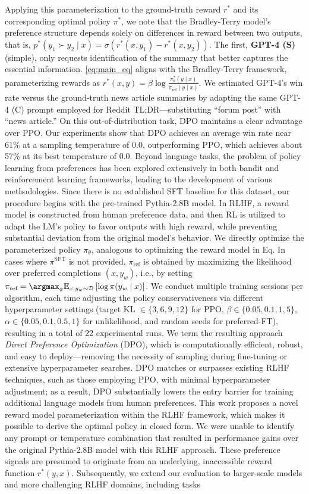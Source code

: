 Applying this parameterization to the ground-truth reward $r^*$ and its corresponding optimal policy $\pi^*$, we note that the Bradley-Terry model’s preference structure depends solely on differences in reward between two outputs, that is, ${p^*(y_1 \succ y_2 \mid x) = \sigma(r^*(x, y_1) - r^*(x, y_2))}$. The first, \textbf{GPT-4 (S)} (simple), only requests identification of the summary that better captures the essential information. \ref{eq:main_eq} aligns with the Bradley-Terry framework, parameterizing rewards as $r^*(x, y) = \beta \log\frac{\pi^*_\theta(y \mid x)}{\pi_\text{ref}(y \mid x)}$. We estimated GPT-4’s win rate versus the ground-truth news article summaries by adapting the same GPT-4 (C) prompt employed for Reddit TL;DR—substituting “forum post” with “news article.” On this out-of-distribution task, DPO maintains a clear advantage over PPO. Our experiments show that DPO achieves an average win rate near 61\% at a sampling temperature of 0.0, outperforming PPO, which achieves about 57\% at its best temperature of 0.0. Beyond language tasks, the problem of policy learning from preferences has been explored extensively in both bandit and reinforcement learning frameworks, leading to the development of various methodologies. Since there is no established SFT baseline for this dataset, our procedure begins with the pre-trained Pythia-2.8B model. In RLHF, a reward model is constructed from human preference data, and then RL is utilized to adapt the LM’s policy to favor outputs with high reward, while preventing substantial deviation from the original model’s behavior. We directly optimize the parameterized policy $\pi_{\theta}$, analogous to optimizing the reward model in Eq. In cases where $\pi^\text{SFT}$ is not provided, $\pi_\text{ref}$ is obtained by maximizing the likelihood over preferred completions ${(x, y_w)}$, i.e., by setting ${\pi_\text{ref} = \argmax_{\pi}\mathbb{E}_{x, y_w \sim \mathcal{D}}\left[\log \pi(y_w \mid x)\right]}$. We conduct multiple training sessions per algorithm, each time adjusting the policy conservativeness via different hyperparameter settings (target KL $\in\{3,6,9,12\}$ for PPO, $\beta \in \{0.05,0.1,1,5\}$, $\alpha\in\{0.05,0.1,0.5,1\}$ for unlikelihood, and random seeds for preferred-FT), resulting in a total of 22 experimental runs. We term the resulting approach \textit{Direct Preference Optimization} (DPO), which is computationally efficient, robust, and easy to deploy—removing the necessity of sampling during fine-tuning or extensive hyperparameter searches. DPO matches or surpasses existing RLHF techniques, such as those employing PPO, with minimal hyperparameter adjustment; as a result, DPO substantially lowers the entry barrier for training additional language models from human preferences. This work proposes a novel reward model parameterization within the RLHF framework, which makes it possible to derive the optimal policy in closed form. We were unable to identify any prompt or temperature combination that resulted in performance gains over the original Pythia-2.8B model with this RLHF approach. These preference signals are presumed to originate from an underlying, inaccessible reward function $r^*(y, x)$. Subsequently, we extend our evaluation to larger-scale models and more challenging RLHF domains, including tasks 